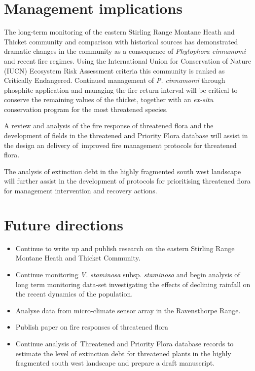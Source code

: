 \documentclass[version=last,
    paper=a4, %
    10pt, %
    usenames,
    dvipsnames,
    oneside, %
    headings=openany, %
    DIV=15 %
]{scrbook}
\begin{document}
\section*{Management implications}
The long-term monitoring of the eastern Stirling Range Montane Heath and
Thicket community and comparison with historical sources has
demonstrated dramatic changes in the community as a consequence of
\emph{Phytophora cinnamomi} and recent fire regimes. Using the
International Union for Conservation of Nature (IUCN) Ecosystem Risk
Assessment criteria this community is ranked as Critically Endangered.
Continued management of \emph{P. cinnamomi} through phosphite
application and managing the fire return interval will be critical to
conserve the remaining values of the thicket, together with an
\emph{ex-situ} conservation program for the most threatened species.

A review and analysis of the fire response of threatened flora and the
development of fields in the threatened and Priority Flora database will
assist in the design an delivery of~improved fire management protocols
for threatened flora.

The analysis of extinction debt in the highly fragmented south west
landscape will further assist in the development of protocols for
prioritising threatened flora for management intervention and recovery
actions.



\section*{Future directions}
\begin{itemize}
\itemsep1pt\parskip0pt
\item
  Continue to write up and publish research on the eastern Stirling
  Range Montane Heath and Thicket Community.
\item
  Continue monitoring \emph{V. staminosa} subsp. \emph{staminosa} and
  begin analysis of long term monitoring data-set investigating the
  effects of declining rainfall on the recent dynamics of the
  population.
\item
  Analyse data from micro-climate sensor array in the Ravensthorpe
  Range.
\item
  Publish paper on fire responses of threatened flora
\item
  Continue analysis of~Threatened and Priority Flora database records to
  estimate the level of extinction debt for threatened plants in the
  highly fragmented south west landscape and prepare a draft manuscript.
\end{itemize}



\end{document}
